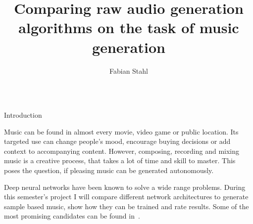 \documentclass[final,hyperref={pdfpagelabels=false}]{beamer}
\title{
Comparing raw audio generation algorithms on the task of music generation
} %
\author{%
Fabian Stahl
} %
\institute{%
Computer Vision \& Mixed Reality Group, Hochschule RheinMain University of Applied Sciences, Wiesbaden
} %
\newcommand{\blocktextwidth}{0.93\textwidth}
\begin{document}
\begin{frame}[t] %

\begin{columns}[t] %


\begin{column}{.31\textwidth} %


{


\vspace{0.9em}

\begin{block}{Introduction}
\begin{minipage}[]{\blocktextwidth}

Music can be found in almost every movie, video game or public location.
Its targeted use can change people's mood, encourage buying decisions or add context to accompanying content.
However, composing, recording and mixing music is a creative process, that takes a lot of time and skill to master.
This poses the question, if pleasing music can be generated autonomously.

Deep neural networks have been known to solve a wide range problems.
During this semester's project I will compare different network architectures to generate sample based music, show how they can be trained and rate results.
Some of the most promising candidates can be found in~\cite{deepsound}.

\end{minipage}
\end{block}
}

\vspace{1.655em}


\end{column}
\end{columns}
\end{frame}
\end{document}
